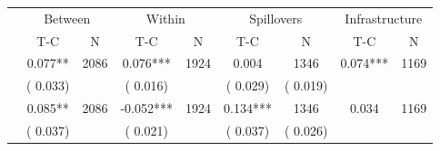 
\begin{tabular}{l*{8}{c}}\hline&\multicolumn{2}{c}{Between}&\multicolumn{2}{c}{Within}&\multicolumn{2}{c}{Spillovers}&\multicolumn{2}{c}{Infrastructure}\\ \cmidrule(r){2-3}\cmidrule(l){4-5}\cmidrule(l){6-7}\cmidrule(l){8-9} & {T-C} & {N} & {T-C} & {N}  & {T-C}  & {N} & {T-C}  & {N} \\ \midrule
        &              0.077**      &       2086       &              0.076***      &       1924       &              0.004      &       1346  &        0.074*** &       1169       \\
                       &       (       0.033)            &                               &       (       0.016)            &                               &       (       0.029)            &       (       0.019) &                  \\
        &              0.085**      &       2086       &             -0.052***      &       1924       &              0.134***      &       1346  &        0.034 &       1169       \\
                       &       (       0.037)            &                               &       (       0.021)            &                               &       (       0.037)            &       (       0.026) &                  \\
\hline \end{tabular}